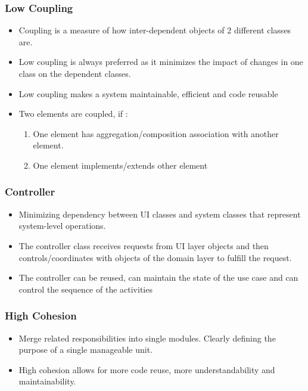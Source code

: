 \documentclass{article}
\begin{document}
\subsubsection{Low Coupling}
\begin{itemize}
    \item Coupling is a measure of how inter-dependent objects of 2 different classes are. 
    
    \item Low coupling is always preferred as it minimizes the impact of changes in one class on the dependent classes. 
    
    \item Low coupling makes a system maintainable, efficient and code reusable
    
    \item Two elements are coupled, if :
    \begin{enumerate}
        \item One element has aggregation/composition association with another element.
        
        \item One element implements/extends other element
    \end{enumerate}
\end{itemize}

\subsubsection{Controller}
\begin{itemize}
    \item Minimizing dependency between UI classes and system classes that represent system-level operations.
    
    \item The controller class receives requests from UI layer objects and then controls/coordinates with objects of the domain layer to fulfill the request.
    
    \item The controller can be reused, can maintain the state of the use case and can control the sequence of the activities
\end{itemize}

\subsubsection{High Cohesion}
\begin{itemize}
    \item Merge related responsibilities into single modules. Clearly defining the purpose of a single manageable unit.
    
    \item High cohesion allows for more code reuse, more understandability and maintainability.
\end{itemize}
\end{document}
